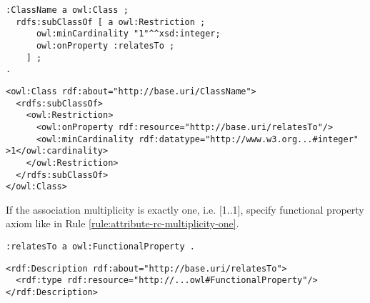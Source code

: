 \vspace{-\parskip}
\begin{minipage}[b]{.385\textwidth}
\begin{lstlisting}[language=Turtle, caption={Min cardinality restriction in Turtle syntax}, captionpos=b]
:ClassName a owl:Class ;
  rdfs:subClassOf [ a owl:Restriction ;
      owl:minCardinality "1"^^xsd:integer;
      owl:onProperty :relatesTo ;
    ] ;
.
\end{lstlisting}
\end{minipage}%
\quad\vspace{-\parskip}
\begin{minipage}[b]{.6\textwidth}
\begin{lstlisting}[language=RDF/XML, caption={Min cardinality restriction in RDF/XML syntax}, captionpos=b]
<owl:Class rdf:about="http://base.uri/ClassName">
  <rdfs:subClassOf>
    <owl:Restriction>
      <owl:onProperty rdf:resource="http://base.uri/relatesTo"/>
      <owl:minCardinality rdf:datatype="http://www.w3.org...#integer" >1</owl:cardinality>
    </owl:Restriction>
  </rdfs:subClassOf>
</owl:Class>
\end{lstlisting}
\end{minipage}
\vspace{-\parskip}

\begin{trule}
	\label{rule:association-uni-multiplicity-one-rc}
	If the association multiplicity is exactly one, i.e. [1..1], specify functional property axiom like in Rule \ref{rule:attribute-rc-multiplicity-one}.
\end{trule}

\vspace{-\parskip}
\begin{minipage}[b]{.385\textwidth}
\begin{lstlisting}[language=Turtle, caption={Declaring a functional property in Turtle syntax}, captionpos=b]
:relatesTo a owl:FunctionalProperty .
\end{lstlisting}
\end{minipage}%
\quad\vspace{-\parskip}
\begin{minipage}[b]{.57\textwidth}
\begin{lstlisting}[language=RDF/XML, caption={Declaring a functional property in RDF/XML syntax}, captionpos=b]
<rdf:Description rdf:about="http://base.uri/relatesTo">
  <rdf:type rdf:resource="http://...owl#FunctionalProperty"/>
</rdf:Description>
\end{lstlisting}
\end{minipage}
\vspace{-\parskip}

